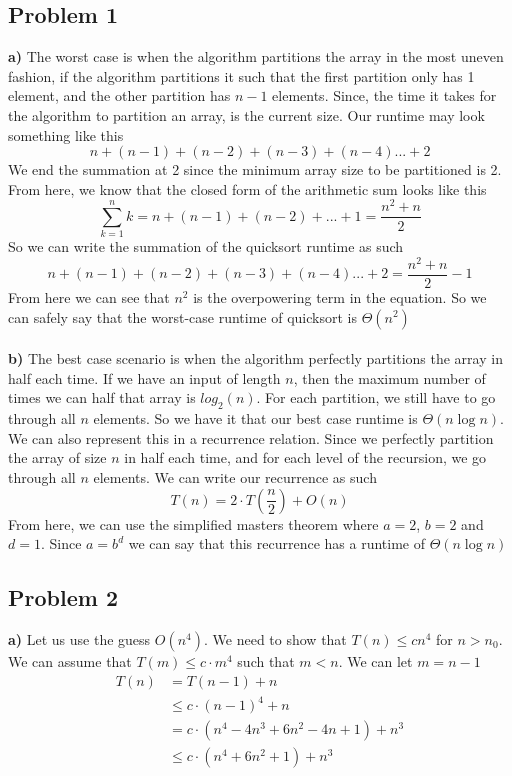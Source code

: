 \documentclass[12pt]{article}
\begin{document}
\subsection*{Problem 1}

\textbf{a)} The worst case is when the algorithm partitions the array in the most uneven fashion, if the algorithm partitions it such that the first partition only has 1 element, and the other partition has $n-1$ elements. Since, the time it takes for the algorithm to partition an array, is the current size. Our runtime may look something like this
\[ n + (n-1) + (n-2) + (n-3) + (n-4) ... + 2 \]
We end the summation at 2 since the minimum array size to be partitioned is 2. From here, we know that the closed form of the arithmetic sum looks like this
\[ \sum^{n}_{k = 1} k = n + (n-1) + (n-2) + ... + 1 = \dfrac{n^2 + n}{2} \]
So we can write the summation of the quicksort runtime as such
\[ n + (n-1) + (n-2) + (n-3) + (n-4) ... + 2 = \dfrac{n^2 + n}{2} -1 \]
From here we can see that $n^2$ is the overpowering term in the equation. So we can safely say that the worst-case runtime of quicksort is $\Theta(n^2)$\\\\

\textbf{b)} The best case scenario is when the algorithm perfectly partitions the array in half each time. If we have an input of length $n$, then the maximum number of times we can half that array is $log_2(n)$. For each partition, we still have to go through all $n$ elements. So we have it that our best case runtime is $\Theta(n \log n)$. We can also represent this in a recurrence relation. Since we perfectly partition the array of size $n$ in half each time, and for each level of the recursion, we go through all $n$ elements. We can write our recurrence as such
\[ T(n) = 2 \cdot T(\dfrac{n}{2}) + O(n)\]
From here, we can use the simplified masters theorem where $a = 2$, $b = 2$ and $d = 1$. Since $a = b^d$ we can say that this recurrence has a runtime of $\Theta(n \log n)$
\newpage

\newpage

\subsection*{Problem 2}
\textbf{a)}
Let us use the guess $O(n^4)$. We need to show that $T(n) \leq cn^4$ for $n > n_0$. We can assume that $T(m) \leq c \cdot m^4$ such that $m < n$. We can let $m = n-1$
\begin{align*}
T(n) &= T(n-1) + n \\
&\leq c \cdot (n-1)^4 + n\\
&= c \cdot (n^4 - 4n^3 + 6n^2 - 4n + 1) + n^3\\
&\leq c \cdot (n^4 + 6n^2 + 1) + n^3
\end{align*}
\end{document}
